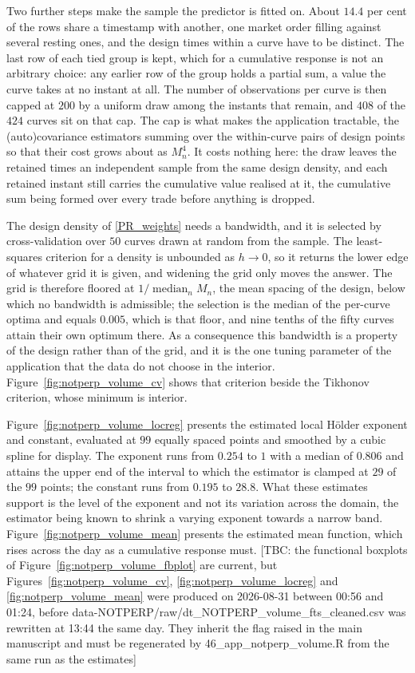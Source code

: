 Two further steps make the sample the predictor is fitted on. About $14.4$ per cent of the rows share a timestamp with another, one market order filling against several resting ones, and the design times within a curve have to be distinct. The last row of each tied group is kept, which for a cumulative response is not an arbitrary choice: any earlier row of the group holds a partial sum, a value the curve takes at no instant at all. The number of observations per curve is then capped at $200$ by a uniform draw among the instants that remain, and $408$ of the $424$ curves sit on that cap. The cap is what makes the application tractable, the (auto)covariance estimators summing over the within-curve pairs of design points so that their cost grows about as $M_n^4$. It costs nothing here: the draw leaves the retained times an independent sample from the same design density, and each retained instant still carries the cumulative value realised at it, the cumulative sum being formed over every trade before anything is dropped.

The design density of \eqref{PR_weights} needs a bandwidth, and it is selected by cross-validation over $50$ curves drawn at random from the sample. The least-squares criterion for a density is unbounded as $h \to 0$, so it returns the lower edge of whatever grid it is given, and widening the grid only moves the answer. The grid is therefore floored at $1/\operatorname{median}_n M_n$, the mean spacing of the design, below which no bandwidth is admissible; the selection is the median of the per-curve optima and equals $0.005$, which is that floor, and nine tenths of the fifty curves attain their own optimum there. As a consequence this bandwidth is a property of the design rather than of the grid, and it is the one tuning parameter of the application that the data do not choose in the interior. Figure~\ref{fig:notperp_volume_cv} shows that criterion beside the Tikhonov criterion, whose minimum is interior.

Figure~\ref{fig:notperp_volume_locreg} presents the estimated local Hölder exponent and constant, evaluated at $99$ equally spaced points and smoothed by a cubic spline for display. The exponent runs from $0.254$ to $1$ with a median of $0.806$ and attains the upper end of the interval to which the estimator is clamped at $29$ of the $99$ points; the constant runs from $0.195$ to $28.8$. What these estimates support is the level of the exponent and not its variation across the domain, the estimator being known to shrink a varying exponent towards a narrow band. Figure~\ref{fig:notperp_volume_mean} presents the estimated mean function, which rises across the day as a cumulative response must.
[TBC: the functional boxplots of Figure~\ref{fig:notperp_volume_fbplot} are current, but Figures~\ref{fig:notperp_volume_cv}, \ref{fig:notperp_volume_locreg} and \ref{fig:notperp_volume_mean} were produced on 2026-08-31 between 00:56 and 01:24, before data-NOTPERP/raw/dt\_NOTPERP\_volume\_fts\_cleaned.csv was rewritten at 13:44 the same day. They inherit the flag raised in the main manuscript and must be regenerated by 46\_app\_notperp\_volume.R from the same run as the estimates]

